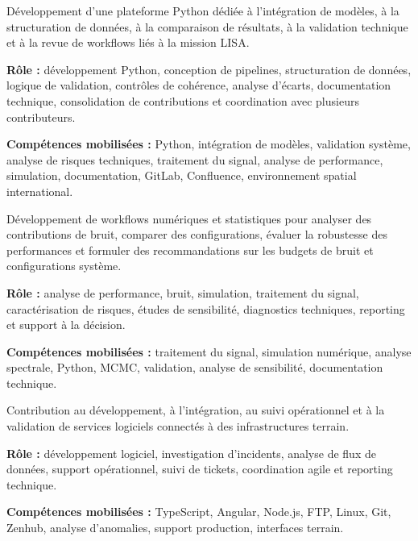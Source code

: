 \documentclass[8pt,a4paper,ragged2e,withhyper]{altacv}
\begin{document}
Développement d’une plateforme Python dédiée à l’intégration de modèles, à la structuration de données, à la comparaison de résultats, à la validation technique et à la revue de workflows liés à la mission LISA.

\textbf{Rôle :} développement Python, conception de pipelines, structuration de données, logique de validation, contrôles de cohérence, analyse d’écarts, documentation technique, consolidation de contributions et coordination avec plusieurs contributeurs.

\textbf{Compétences mobilisées :} Python, intégration de modèles, validation système, analyse de risques techniques, traitement du signal, analyse de performance, simulation, documentation, GitLab, Confluence, environnement spatial international.

\divider


Développement de workflows numériques et statistiques pour analyser des contributions de bruit, comparer des configurations, évaluer la robustesse des performances et formuler des recommandations sur les budgets de bruit et configurations système.

\textbf{Rôle :} analyse de performance, bruit, simulation, traitement du signal, caractérisation de risques, études de sensibilité, diagnostics techniques, reporting et support à la décision.

\textbf{Compétences mobilisées :} traitement du signal, simulation numérique, analyse spectrale, Python, MCMC, validation, analyse de sensibilité, documentation technique.

\divider


Contribution au développement, à l’intégration, au suivi opérationnel et à la validation de services logiciels connectés à des infrastructures terrain.

\textbf{Rôle :} développement logiciel, investigation d’incidents, analyse de flux de données, support opérationnel, suivi de tickets, coordination agile et reporting technique.

\textbf{Compétences mobilisées :} TypeScript, Angular, Node.js, FTP, Linux, Git, Zenhub, analyse d’anomalies, support production, interfaces terrain.
\end{document}
